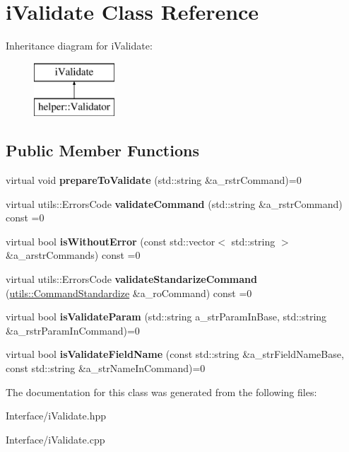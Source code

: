 \hypertarget{classi_validate}{}\section{i\+Validate Class Reference}
\label{classi_validate}
Inheritance diagram for i\+Validate\+:\begin{figure}[H]
\begin{center}
\leavevmode
\includegraphics[height=2.000000cm]{classi_validate}
\end{center}
\end{figure}
\subsection*{Public Member Functions}
\begin{DoxyCompactItemize}
\item 
\mbox{\label{classi_validate_aa28f52bcf8951fb6bb84e9c3fac082b4}} 
virtual void {\bfseries prepare\+To\+Validate} (std\+::string \&a\+\_\+rstr\+Command)=0
\item 
\mbox{\label{classi_validate_a38bfb9a556e1e4ab12f7d49b32b923f5}} 
virtual utils\+::\+Errors\+Code {\bfseries validate\+Command} (std\+::string \&a\+\_\+rstr\+Command) const =0
\item 
\mbox{\label{classi_validate_a15d61e1138765be5981be64f82e2a894}} 
virtual bool {\bfseries is\+Without\+Error} (const std\+::vector$<$ std\+::string $>$ \&a\+\_\+arstr\+Commands) const =0
\item 
\mbox{\label{classi_validate_ab4d7a204976e3515c9d95f040033f4be}} 
virtual utils\+::\+Errors\+Code {\bfseries validate\+Standarize\+Command} (\mbox{\hyperlink{structutils_1_1_command_standardize}{utils\+::\+Command\+Standardize}} \&a\+\_\+ro\+Command) const =0
\item 
\mbox{\label{classi_validate_a83f8d68827931b03cc578ced7a6b40b6}} 
virtual bool {\bfseries is\+Validate\+Param} (std\+::string a\+\_\+str\+Param\+In\+Base, std\+::string \&a\+\_\+rstr\+Param\+In\+Command)=0
\item 
\mbox{\label{classi_validate_aae3db1d13561539d20a5da9f69af5610}} 
virtual bool {\bfseries is\+Validate\+Field\+Name} (const std\+::string \&a\+\_\+str\+Field\+Name\+Base, const std\+::string \&a\+\_\+str\+Name\+In\+Command)=0
\end{DoxyCompactItemize}


The documentation for this class was generated from the following files\+:\begin{DoxyCompactItemize}
\item 
Interface/i\+Validate.\+hpp\item 
Interface/i\+Validate.\+cpp\end{DoxyCompactItemize}
